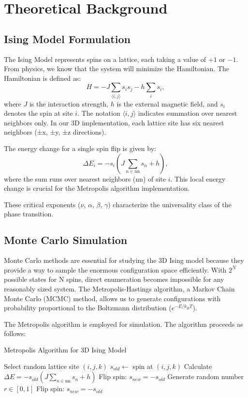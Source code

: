 \documentclass{article}
\begin{document}
\section{Theoretical Background}
\subsection{Ising Model Formulation}
The Ising Model represents spins on a lattice, each taking a value of $+1$ or $-1$. From physics, we know that the system will minimize the Hamiltonian. The Hamiltonian is defined as:
\begin{equation}
H = -J \sum_{\langle i,j \rangle} s_i s_j - h \sum_i s_i,
\end{equation}
where $J$ is the interaction strength, $h$ is the external magnetic field, and $s_i$ denotes the spin at site $i$. The notation $\langle i,j \rangle$ indicates summation over nearest neighbors only. In our 3D implementation, each lattice site has six nearest neighbors (±x, ±y, ±z directions).

The energy change for a single spin flip is given by:
\begin{equation}
\Delta E_i = -s_i\left(J\sum_{n \in \text{nn}} s_n + h\right),
\end{equation}
where the sum runs over nearest neighbors (nn) of site $i$. This local energy change is crucial for the Metropolis algorithm implementation.

These critical exponents ($\nu$, $\alpha$, $\beta$, $\gamma$) characterize the universality class of the phase transition.

\subsection{Monte Carlo Simulation}
Monte Carlo methods are essential for studying the 3D Ising model because they provide a way to sample the enormous configuration space efficiently. With $2^N$ possible states for N spins, direct enumeration becomes impossible for any reasonably sized system. The Metropolis-Hastings algorithm, a Markov Chain Monte Carlo (MCMC) method, allows us to generate configurations with probability proportional to the Boltzmann distribution ($e^{-E/k_BT}$).

The Metropolis algorithm is employed for simulation. The algorithm proceeds as follows:

\begin{algorithm}
\caption{Metropolis Algorithm for 3D Ising Model}
\begin{algorithmic}[1]
    \State Select random lattice site $(i,j,k)$
    \State $s_{old} \gets$ spin at $(i,j,k)$
    \State Calculate $\Delta E = -s_{old}(J\sum_{n \in \text{nn}} s_n + h)$
        \State Flip spin: $s_{new} = -s_{old}$
    \Else
        \State Generate random number $r \in [0,1]$
            \State Flip spin: $s_{new} = -s_{old}$
        \EndIf
    \EndIf
\EndFor
\end{algorithmic}
\end{algorithm}
\end{document}
